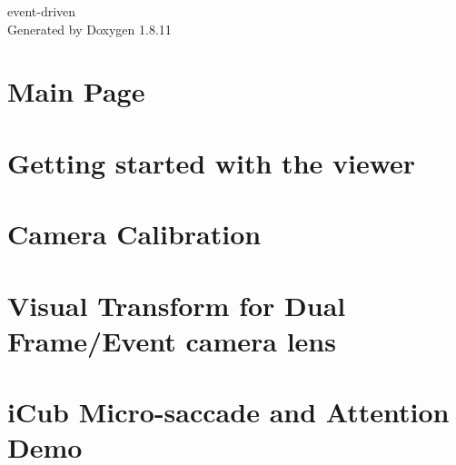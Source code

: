\documentclass[twoside]{book}
\newcommand{\+}{\discretionary{\mbox{\scriptsize$\hookleftarrow$}}{}{}}
\newcommand{\clearemptydoublepage}{%
  \newpage{\pagestyle{empty}\cleardoublepage}%
}
\begin{document}
\hypersetup{pageanchor=false,
             bookmarksnumbered=true,
             pdfencoding=unicode
            }
\begin{titlepage}
\vspace*{7cm}
\begin{center}%
{\Large event-\/driven }\\
\vspace*{1cm}
{\large Generated by Doxygen 1.8.11}\\
\end{center}
\end{titlepage}
\clearemptydoublepage
\tableofcontents
\clearemptydoublepage
{}
\hypersetup{pageanchor=true}

\chapter{Main Page}
\label{index}\hypertarget{index}{}
\chapter{Getting started with the viewer}
\label{md__home_aglover_projects_event-driven_documentation_1viewer}
\hypertarget{md__home_aglover_projects_event-driven_documentation_1viewer}{}

\chapter{Camera Calibration}
\label{md__home_aglover_projects_event-driven_documentation_2calibration}
\hypertarget{md__home_aglover_projects_event-driven_documentation_2calibration}{}

\chapter{Visual Transform for Dual Frame/\+Event camera lens}
\label{md__home_aglover_projects_event-driven_documentation_3a.dualcam}
\hypertarget{md__home_aglover_projects_event-driven_documentation_3a.dualcam}{}

\chapter{i\+Cub Micro-\/saccade and Attention Demo}
\label{md__home_aglover_projects_event-driven_documentation_3b.autosaccade}
\hypertarget{md__home_aglover_projects_event-driven_documentation_3b.autosaccade}{}

\end{document}
